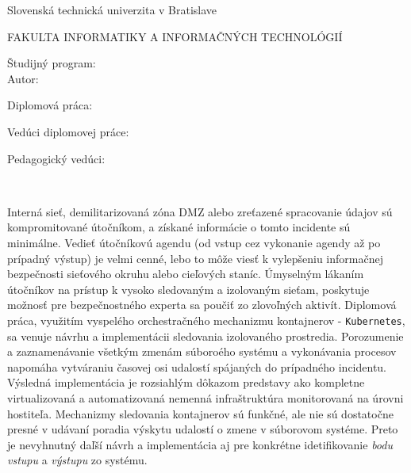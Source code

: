 \begin{minipage}[t]{1\columnwidth}%
Slovenská technická univerzita v Bratislave

FAKULTA INFORMATIKY A INFORMAČNÝCH TECHNOLÓGIÍ

Študijný program: \mojStudProgram\\

Autor: \mojeMeno

Diplomová práca: \mojNazov

Vedúci diplomovej práce: \mojVeduci

Pedagogický vedúci: \mojPedagogVeduci

\mojDatum\\
\end{minipage}


Interná sieť, demilitarizovaná zóna DMZ alebo zreťazené spracovanie údajov sú kompromitované útočníkom, a získané informácie o tomto incidente sú minimálne. Vedieť útočníkovú agendu (od vstup cez vykonanie agendy až po prípadný výstup) je velmi cenné, lebo to môže viesť k vylepšeniu informačnej bezpečnosti sieťového okruhu alebo cieľových staníc. Úmyselným lákaním útočníkov na prístup k vysoko sledovaným a izolovaným sieťam, poskytuje možnosť pre bezpečnostného experta sa poučiť zo zlovoľných aktivít. Diplomová práca, využitím vyspelého orchestračného mechanizmu kontajnerov - \texttt{Kubernetes}, sa venuje návrhu a implementácii sledovania izolovaného prostredia. Porozumenie a zaznamenávanie všetkým zmenám súboroého systému a vykonávania procesov napomáha vytváraniu časovej osi udalostí spájaných do prípadného incidentu. Výsledná implementácia je rozsiahlým dôkazom predstavy ako kompletne virtualizovaná a automatizovaná nemenná infraštruktúra monitorovaná na úrovni hostiteľa. Mechanizmy sledovania kontajnerov sú funkčné, ale nie sú dostatočne presné v udávaní poradia výskytu udalostí o zmene v súborovom systéme. Preto je nevyhnutný daľší návrh a implementácia aj pre konkrétne idetifikovanie \textit{bodu vstupu} a \textit{výstupu} zo systému.


\newpage{}\thispagestyle{empty}\medskip{}


\newpage{}

\newpage
\thispagestyle{empty}
\mbox{}
\newpage

